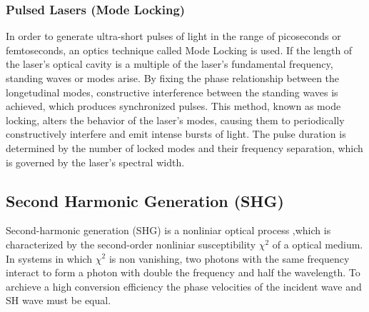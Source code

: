 \subsubsection{Pulsed Lasers (Mode Locking)}
    In order to generate ultra-short pulses of light in the range of picoseconds or femtoseconds, an optics technique called Mode Locking is used.
If the length of the laser's optical cavity is a multiple of the laser's fundamental frequency, standing waves or modes arise.
By fixing the phase relationship between the longetudinal modes, constructive interference between the standing waves is achieved, which produces synchronized pulses.
This method, known as mode locking, alters the behavior of the laser's modes, causing them to periodically constructively interfere and emit intense bursts of light.
The pulse duration is determined by the number of locked modes and their frequency separation, which is governed by the laser's spectral width.
    
\subsection{Second Harmonic Generation (SHG)}
    Second-harmonic generation (SHG) is a nonliniar optical process ,which is characterized by the second-order nonliniar susceptibility $\chi^{2}$ of a optical medium.
    In systems in which $\chi^{2}$ is non vanishing, two photons with the same frequency interact to form a photon with double the frequency and half the wavelength.
    To archieve a high conversion efficiency the phase velocities of the incident wave and SH wave must be equal. \cite{demtroder2014laser}
     
